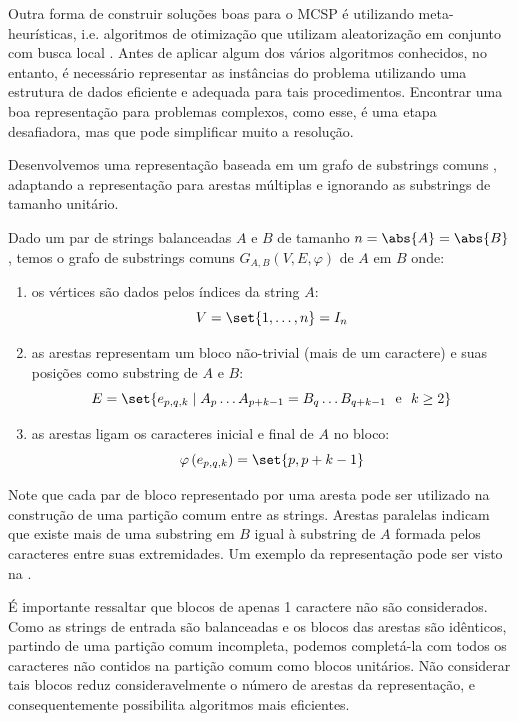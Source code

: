 Outra forma de construir soluções boas para o MCSP é utilizando meta-heurísticas, i.e. algoritmos de otimização que utilizam aleatorização em conjunto com busca local \cite[p.~4]{yang_nature-inspired_2010}. Antes de aplicar algum dos vários algoritmos conhecidos, no entanto, é necessário representar as instâncias do problema utilizando uma estrutura de dados eficiente e adequada para tais procedimentos. Encontrar uma boa representação para problemas complexos, como esse, é uma etapa desafiadora, mas que pode simplificar muito a resolução.

Desenvolvemos uma representação baseada em um grafo de substrings comuns \cite{ferdous_solving_2013}, adaptando a representação para arestas múltiplas e ignorando as substrings de tamanho unitário.

\begin{definition}
    Dado um par de strings balanceadas $A$ e $B$ de tamanho $n = \abs{A} = \abs{B}$, temos o grafo de substrings comuns $G_{A,B}(V,E,\varphi)$ de $A$ em $B$ onde:

    \begin{enumerate}[
        label = {\alph*)},
        ref = \thedefinition.\alph*,
        parsep = 0pt,
        itemsep = 0.2em,
        topsep = 0pt
    ]
        \item os vértices são dados pelos índices da string $A$: \[
            V = \set{1, \ldots, n} = I_n
        \]

        \item as arestas representam um bloco não-trivial (mais de um caractere) e suas posições como substring de $A$ e $B$: \[
            E = \set{e_{p, q, k} \mid A_p \ldots A_{p + k - 1} = B_q \ldots B_{q + k - 1} ~\text{ e }~ k \geq 2}
        \]

        \item as arestas ligam os caracteres inicial e final de $A$ no bloco: \[
            \varphi\left(e_{p, q, k}\right) = \set{p, p + k - 1}
        \]
    \end{enumerate}
\end{definition}

Note que cada par de bloco representado por uma aresta pode ser utilizado na construção de uma partição comum entre as strings. Arestas paralelas indicam que existe mais de uma substring em $B$ igual à substring de $A$ formada pelos caracteres entre suas extremidades. Um exemplo da representação pode ser visto na .

É importante ressaltar que blocos de apenas 1 caractere não são considerados. Como as strings de entrada são balanceadas e os blocos das arestas são idênticos, partindo de uma partição comum incompleta, podemos completá-la com todos os caracteres não contidos na partição comum como blocos unitários. Não considerar tais blocos reduz consideravelmente o número de arestas da representação, e consequentemente possibilita algoritmos mais eficientes.

